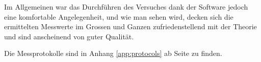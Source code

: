 Im Allgemeinen  war das Durchf\"uhren  des Versuches dank der  Software jedoch
eine  komfortable Angelegenheit,  und  wie  man sehen  wird,  decken sich  die
ermittelten Messwerte im Grossen und  Ganzen zufriedenstellend mit der Theorie
und sind anscheinend von guter Qualit\"at.

Die   Messprotokolle    sind   in   Anhang   \ref{app:protocols}    ab   Seite
\pageref{app:protocols} zu finden.
